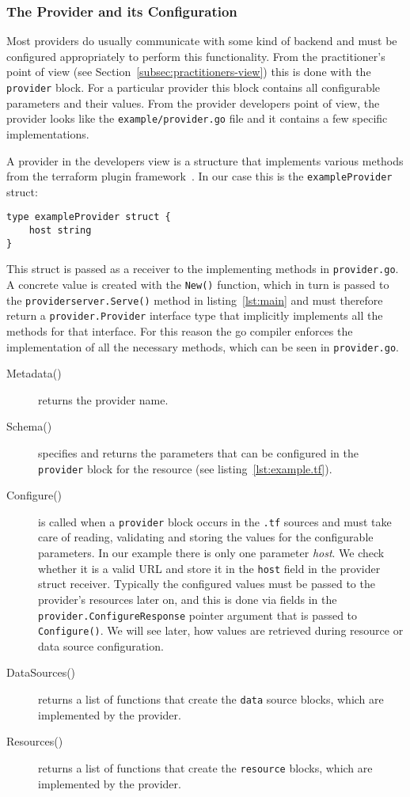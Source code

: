 \documentclass[paper=a4,11pt,numbers=noenddot]{article}
\begin{document}
\subsubsection{The Provider and its Configuration}
\label{subsubsec:base-prov-conf}

Most providers do usually communicate with some kind of backend and must be configured appropriately to perform this functionality. From the practitioner's point of view (see Section~\ref{subsec:practitioners-view}) this is done with the \verb'provider' block. For a particular provider this block contains all configurable parameters and their values. From the provider developers point of view, the provider looks like the \verb'example/provider.go' file and it contains a few specific implementations.

A provider in the developers view is a structure that implements various methods from the terraform plugin framework~\autocite{noauthor_terraform_framework_nodate}. In our case this is the \verb'exampleProvider' struct:

\begin{lstlisting}
type exampleProvider struct {
	host string
}
\end{lstlisting}

This struct is passed as a receiver to the implementing methods in \verb'provider.go'. A concrete value is created with the \verb'New()' function, which in turn is passed to the \verb'providerserver.Serve()' method in listing~\ref{lst:main} and must therefore return a \verb'provider.Provider' interface type that implicitly implements all the methods for that interface. For this reason the go compiler enforces the implementation of all the necessary methods, which can be seen in \verb'provider.go'.

\begin{description}
\item[Metadata()] returns the provider name.
\item[Schema()] specifies and returns the parameters that can be configured in the \verb'provider' block for the resource (see listing~\ref{lst:example.tf}).
\item[Configure()] is called when a \verb'provider' block occurs in the \verb'.tf' sources and must take care of reading, validating and storing the values for the configurable parameters. In our example there is only one parameter \emph{host}. We check whether it is a valid URL and store it in the \verb'host' field in the provider struct receiver. Typically the configured values must be passed to the provider's resources later on, and this is done via fields in the \verb'provider.ConfigureResponse' pointer argument that is passed to \verb'Configure()'. We will see later, how values are retrieved during resource or data source configuration.
\item[DataSources()] returns a list of functions that create the \verb'data' source blocks, which are implemented by the provider.
  \item[Resources()] returns a list of functions that create the \verb'resource' blocks, which are implemented by the provider.
\end{description}
\end{document}
